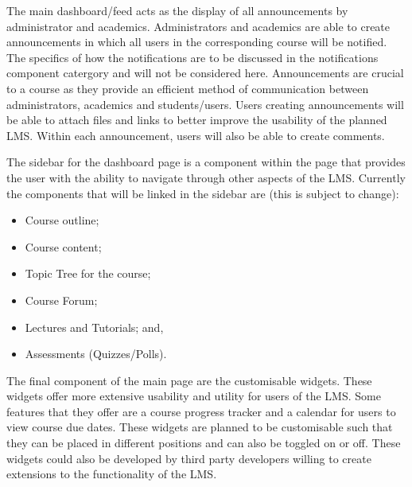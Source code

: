 The main dashboard/feed acts as the display of all announcements by administrator and academics. Administrators and academics are able to create announcements in which all users in the corresponding course will be notified.
The specifics of how the notifications are to be discussed in the notifications component catergory and will not be considered here. 
Announcements are crucial to a course as they provide an efficient method of communication between administrators, academics and students/users.
Users creating announcements will be able to attach files and links to better improve the usability of the planned LMS.
Within each announcement, users will also be able to create comments.

The sidebar for the dashboard page is a component within the page that provides the user with the ability to navigate through other aspects of the LMS.
Currently the components that will be linked in the sidebar are (this is subject to change):
\begin{itemize}
    \item Course outline;
    \item Course content;
    \item Topic Tree for the course;
    \item Course Forum;
    \item Lectures and Tutorials; and,
    \item Assessments (Quizzes/Polls).
\end{itemize}

The final component of the main page are the customisable widgets. These widgets offer more extensive usability and utility for users of the LMS.
Some features that they offer are a course progress tracker and a calendar for users to view course due dates. 
These widgets are planned to be customisable such that they can be placed in different positions and can also be toggled on or off.
These widgets could also be developed by third party developers willing to create extensions to the functionality of the LMS.


